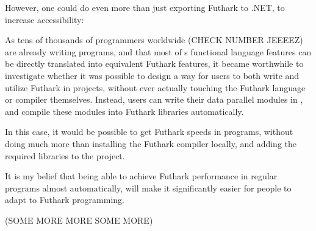 However, one could do even more than just exporting Futhark to .NET, to increase
accessibility:

As tens of thousands of programmers worldwide (CHECK NUMBER JEEEEZ) are already
writing \fsharp{} programs, and that most of \fsharp{}s functional language features can be
directly translated into equivalent Futhark features, it became worthwhile to
investigate whether it was possible to design a way for users to both write and
utilize Futhark in \fsharp{} projects, without ever actually touching the
Futhark language or compiler themselves.
Instead, users can write their data parallel \fsharp{} modules in \fshark{}, and compile these
modules into Futhark libraries automatically.

In this case, it would be possible to get Futhark speeds in \fsharp{} programs,
without doing much more than installing the Futhark compiler locally, and adding
the required \fshark{} libraries to the \fsharp{} project.

It is my belief that being able to achieve Futhark performance in regular \fsharp{}
programs almost automatically, will make it significantly easier for people to
adapt to Futhark programming.

(SOME MORE MORE SOME MORE)

\clearpage
